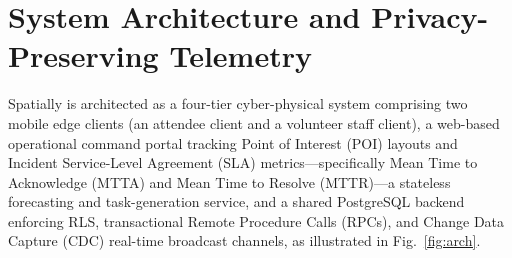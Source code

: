 \documentclass[conference,a4paper]{IEEEtran}
\begin{document}
\section{System Architecture and Privacy-Preserving Telemetry}
\label{sec:arch}
Spatially is architected as a four-tier cyber-physical system comprising two mobile edge clients (an attendee client and a volunteer staff client), a web-based operational command portal tracking Point of Interest (POI) layouts and Incident Service-Level Agreement (SLA) metrics---specifically Mean Time to Acknowledge (MTTA) and Mean Time to Resolve (MTTR)---a stateless forecasting and task-generation service, and a shared PostgreSQL backend enforcing RLS, transactional Remote Procedure Calls (RPCs), and Change Data Capture (CDC) real-time broadcast channels, as illustrated in Fig.~\ref{fig:arch}.
\end{document}
